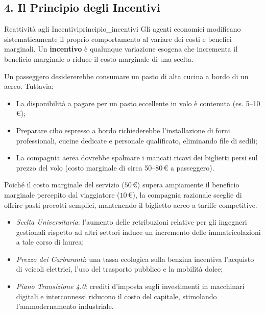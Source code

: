 \subsection{4. Il Principio degli Incentivi}

\begin{legge}{Reattività agli Incentivi}{principio_incentivi}
Gli agenti economici modificano sistematicamente il proprio comportamento al variare dei costi e benefici marginali. Un \textbf{incentivo} è qualunque variazione esogena che incrementa il beneficio marginale o riduce il costo marginale di una scelta.
\end{legge}

\begin{esempio}
Un passeggero desidererebbe consumare un pasto di alta cucina a bordo di un aereo. Tuttavia:
\begin{itemize}
    \item La disponibilità a pagare per un pasto eccellente in volo è contenuta (es. 5--10\,\euro{});
    \item Preparare cibo espresso a bordo richiederebbe l'installazione di forni professionali, cucine dedicate e personale qualificato, eliminando file di sedili;
    \item La compagnia aerea dovrebbe spalmare i mancati ricavi dei biglietti persi sul prezzo del volo (costo marginale di circa 50--80\,\euro{} a passeggero).
\end{itemize}
Poiché il costo marginale del servizio ($50$\,\euro{}) supera ampiamente il beneficio marginale percepito dal viaggiatore ($10$\,\euro{}), la compagnia razionale sceglie di offrire pasti precotti semplici, mantenendo il biglietto aereo a tariffe competitive.
\end{esempio}

\begin{esempio}
\begin{itemize}
    \item \textit{Scelta Universitaria}: l'aumento delle retribuzioni relative per gli ingegneri gestionali rispetto ad altri settori induce un incremento delle immatricolazioni a tale corso di laurea;
    \item \textit{Prezzo dei Carburanti}: una tassa ecologica sulla benzina incentiva l'acquisto di veicoli elettrici, l'uso del trasporto pubblico e la mobilità dolce;
    \item \textit{Piano Transizione 4.0}: crediti d'imposta sugli investimenti in macchinari digitali e interconnessi riducono il costo del capitale, stimolando l'ammodernamento industriale.
\end{itemize}
\end{esempio}

